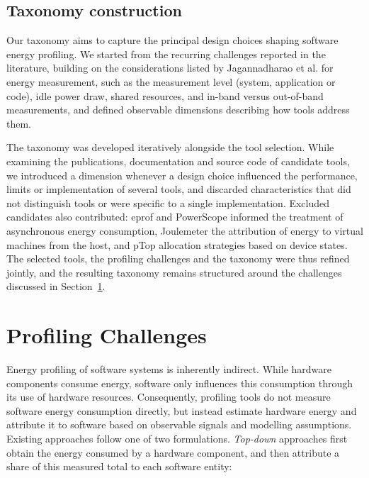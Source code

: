 \documentclass[
  acmsmall,
  screen,
  review,
  xcolor={dvipsnames,usenames}
]{acmart}
\begin{document}
\subsection{Taxonomy construction}\label{sec:taxonomy-construction}
Our taxonomy aims to capture the principal design choices shaping software energy profiling. We started from the recurring challenges reported in the literature, building on the considerations listed by Jagannadharao et al. \cite{jagannadharaoBeginnersGuidePower2024} for energy measurement, such as the measurement level (system, application or code), idle power draw, shared resources, and in-band versus out-of-band measurements, and defined observable dimensions describing how tools address them.

The taxonomy was developed iteratively alongside the tool selection. While examining the publications, documentation and source code of candidate tools, we introduced a dimension whenever a design choice influenced the performance, limits or implementation of several tools, and discarded characteristics that did not distinguish tools or were specific to a single implementation. Excluded candidates also contributed: eprof \cite{schubertProfilingSoftwareEnergy2012} and PowerScope \cite{flinnPowerScopeToolProfiling1999} informed the treatment of asynchronous energy consumption, Joulemeter \cite{kansalVirtualMachinePower2010} the attribution of energy to virtual machines from the host, and pTop \cite{doPTopProcesslevelPower2009} allocation strategies based on device states. The selected tools, the profiling challenges and the taxonomy were thus refined jointly, and the resulting taxonomy remains structured around the challenges discussed in Section~\ref{challenges}.

\section{Profiling Challenges} \label{challenges}

Energy profiling of software systems is inherently indirect. While hardware components consume energy, software only influences this consumption through its use of hardware resources. Consequently, profiling tools do not measure software energy consumption directly, but instead estimate hardware energy and attribute it to software based on observable signals and modelling assumptions. Existing approaches follow one of two formulations. \emph{Top-down} approaches first obtain the energy consumed by a hardware component, and then attribute a share of this measured total to each software entity:
\end{document}
